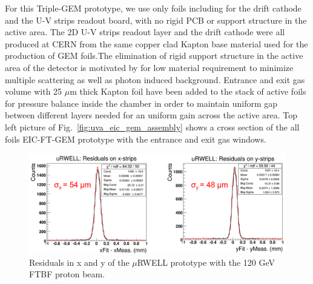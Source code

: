 \begin{enumerate}
%
For this Triple-GEM prototype, we use only foils including for the drift cathode and the U-V strips readout board, with no rigid PCB or support structure  in the active area. The 2D U-V strips readout layer and the drift cathode were all produced at CERN from the same copper clad Kapton base material used for the production of GEM foils.The elimination of rigid support structure in the active area of the detector is motivated by for low material requirement to minimize multiple scattering as well as photon induced background. Entrance and exit gas volume with 25 $\mu$m thick Kapton foil have been added to the stack of active foils for pressure balance inside the chamber in order to maintain uniform gap between different layers needed for an uniform gain across the active area.  Top left picture of Fig.~\ref{fig:uva_eic_gem_assembly} shows a cross section of the all foils EIC-FT-GEM prototype with the entrance and exit gas windows.
%
\begin{figure}[htb]
\centering
\includegraphics[width=1\columnwidth,trim={0pt 0mm 0pt 0mm},clip]{UVa_plots/uRwellResidual}
\caption{\label{fig:uRwellResidual} Residuals in x and y of the $\mu$RWELL prototype with the 120 GeV FTBF proton beam.}
\end{figure}
%
\end{enumerate}
